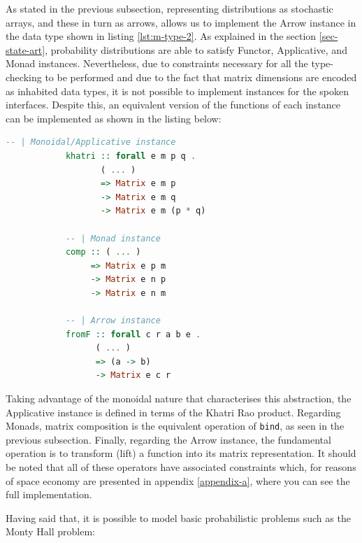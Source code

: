 \documentclass[
  oneside,
  11pt, a4paper,
  footinclude=true,
  headinclude=true,
  cleardoublepage=empty
]{scrbook}
\theoremstyle{definition}
\theoremstyle{definition}
\begin{document}
        As stated in the previous subsection, representing distributions as stochastic arrays, and these in turn as arrows, allows us to implement the Arrow instance in the data type shown in listing \ref{lst:m-type-2}. As explained in the section \ref{sec-state-art}, probability distributions are able to satisfy Functor, Applicative, and Monad instances. Nevertheless, due to constraints necessary for all the type-checking to be performed and due to the fact that matrix dimensions are encoded as inhabited data types, it is not possible to implement instances for the spoken interfaces. Despite this, an equivalent version of the functions of each instance can be implemented as shown in the listing below:
        
        \begin{lstlisting}[language=Haskell, caption={Interface equivalent function implementations},captionpos=b]
            -- | Monoidal/Applicative instance
            khatri :: forall e m p q .
                   ( ... )
                   => Matrix e m p 
                   -> Matrix e m q
                   -> Matrix e m (p * q)

            -- | Monad instance
            comp :: ( ... )
                 => Matrix e p m
                 -> Matrix e n p 
                 -> Matrix e n m

            -- | Arrow instance
            fromF :: forall c r a b e . 
                  ( ... ) 
                  => (a -> b) 
                  -> Matrix e c r
        \end{lstlisting}{}
        
        Taking advantage of the monoidal nature that characterises this abstraction, the Applicative instance is defined in terms of the Khatri Rao product. Regarding Monads, matrix composition is the equivalent operation of \texttt{bind}, as seen in the previous subsection. Finally, regarding the Arrow instance, the fundamental operation is to transform (lift) a function into its matrix representation. It should be noted that all of these operators have associated constraints which, for reasons of space economy are presented in appendix \ref{appendix-a}, where you can see the full implementation.
        
        Having said that, it is possible to model basic probabilistic problems such as the Monty Hall problem:
        
\end{document}
